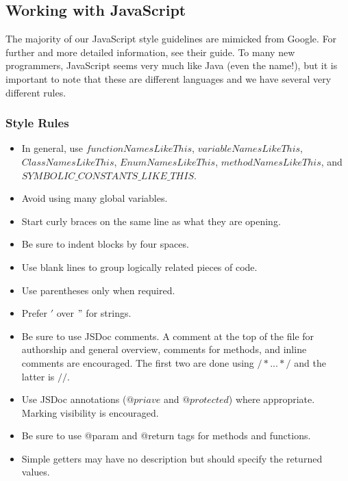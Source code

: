 \documentclass[12pt]{article}
\newenvironment{itemize*}%
  {\begin{itemize}%
  	\setlength{\parsep}{0pt}
    \setlength{\itemsep}{0pt}%
    \setlength{\parskip}{0pt}}%
  {\end{itemize}}
\begin{document}
\begin{itemize*}
\subsection{Working with JavaScript}
The majority of our JavaScript style guidelines are mimicked from Google\cite{JavaScriptStyle-Google}.  For further and more detailed information, see their guide.  To many new programmers, JavaScript seems very much like Java (even the name!), but it is important to note that these are different languages and we have several very different rules.

\subsubsection{Style Rules}
\begin{itemize}
\item In general, use $functionNamesLikeThis$, $variableNamesLikeThis$, $ClassNamesLikeThis$, $EnumNamesLikeThis$, $methodNamesLikeThis$, and $SYMBOLIC\_CONSTANTS\_LIKE\_THIS$.
\item Avoid using many global variables.
\item Start curly braces on the same line as what they are opening.
\item Be sure to indent blocks by four spaces.
\item Use blank lines to group logically related pieces of code.
\item Use parentheses only when required.
\item Prefer $'$ over $"$ for strings.
\item Be sure to use JSDoc comments.  A comment at the top of the file for authorship and general overview, comments for methods, and inline comments are encouraged.  The first two are done using $/*. . . */$ and the latter is $//$.
\item Use JSDoc annotations ($@priave$ and $@protected$) where appropriate.  Marking visibility is encouraged.
\item Be sure to use @param and @return tags for methods and functions.
\item Simple getters may have no description but should specify the returned values.
\end{itemize}


\end{itemize*}
\end{document}
